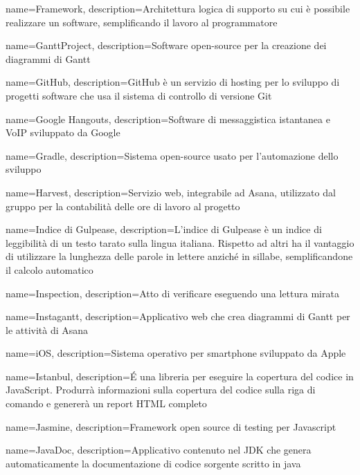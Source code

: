 {
	name={Framework},
	description={Architettura logica di supporto su cui è possibile realizzare un software, semplificando il lavoro al programmatore}
	{\newpage}
}

{
	name={GanttProject},
	description={Software open-source per la creazione dei diagrammi di Gantt}
}

{
	name={GitHub},
	description={GitHub è un servizio di hosting per lo sviluppo di progetti software che usa il sistema di controllo di versione Git}
}

{
	name={Google Hangouts},
	description={Software di messaggistica istantanea e VoIP sviluppato da Google}
}

{
	name={Gradle},
	description={Sistema open-source usato per l'automazione dello sviluppo}
	{\newpage}
}

{
	name={Harvest},
	description={Servizio web, integrabile ad Asana, utilizzato dal gruppo per la contabilità delle ore di lavoro al progetto}
	{\newpage}
}

{
	name={Indice di Gulpease},
	description={L’indice di Gulpease è un indice di leggibilità di un testo tarato sulla lingua
		italiana. Rispetto ad altri ha il vantaggio di utilizzare la lunghezza delle parole in lettere anziché in sillabe, semplificandone il calcolo automatico}
}

{
	name={Inspection},
	description={Atto di verificare eseguendo una lettura mirata}
}

{
	name={Instagantt},
	description={Applicativo web che crea diagrammi di Gantt per le attività di Asana}
}

{
	name={iOS},
	description={Sistema operativo per smartphone sviluppato da Apple}
}

{
	name={Istanbul},
	description={É una libreria per eseguire la copertura del codice in JavaScript. Produrrà informazioni sulla copertura del codice sulla riga di comando e genererà un report HTML completo}
	{\newpage}
}

{
	name={Jasmine},
	description={Framework open source di testing per Javascript}
}

{
	name={JavaDoc},
	description={Applicativo contenuto nel JDK che genera automaticamente la documentazione di codice sorgente scritto in java}
}

